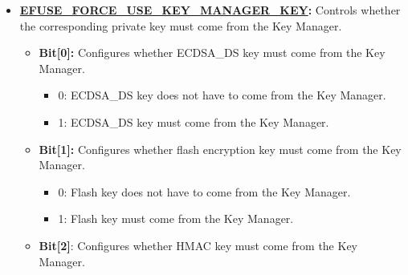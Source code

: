 \documentclass[main\_\_EN.tex]{subfiles}
\begin{document}
\begin{enumerate}
\begin{itemize}
\begin{itemize}
            \item \textbf{Bit[0]:} Configures whether ECDSA Digital Signature Peripheral (ECDSA\_DS) key can be deployed only once.
                \begin{itemize}
                    \item 0: ECDSA\_DS key can be deployed more than once.
                    \item 1: ECDSA\_DS key can be deployed only once.
                \end{itemize}
            \item \textbf{Bit[1]}: Configures whether XTS key can be deployed only once.
                \begin{itemize}
                    \item 0: XTS key can be deployed more than once.
                    \item 1: XTS key can be deployed only once.
                \end{itemize}
        \end{itemize}
        \item \textbf{\hyperref[fielddesc:EFUSEFORCEUSEKEYMANAGERKEY]{EFUSE\_FORCE\_USE\_KEY\_MANAGER\_KEY}:} Controls whether the corresponding private key must come from the Key Manager. 
        \begin{itemize}
            \item \textbf{Bit[0]:} Configures whether ECDSA\_DS key must come from the Key Manager.
                \begin{itemize}
                    \item 0: ECDSA\_DS key does not have to come from the Key Manager.
                    \item 1: ECDSA\_DS key must come from the Key Manager.
                \end{itemize}
            \item \textbf{Bit[1]:} Configures whether flash encryption key must come from the Key Manager.
                \begin{itemize}
                    \item 0: Flash key does not have to come from the Key Manager.
                    \item 1: Flash key must come from the Key Manager.
                \end{itemize}
            \item \textbf{Bit[2]}: Configures whether HMAC key must come from the Key Manager.
                \begin{itemize}

\end{itemize}
\end{itemize}
\end{itemize}
\end{enumerate}
\end{document}
